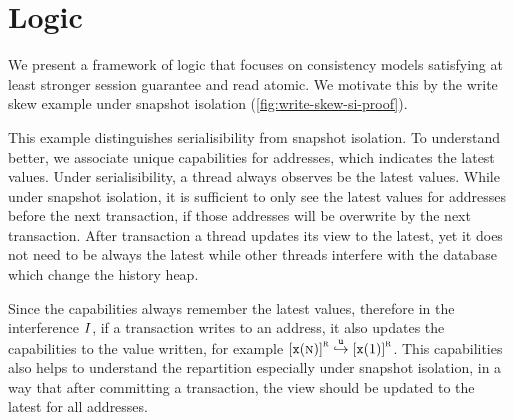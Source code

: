 \section{Logic}


We present a framework of logic that focuses on consistency models satisfying at least stronger session guarantee and read atomic.
We motivate this by the write skew example under snapshot isolation (\cref{fig:write-skew-si-proof}).

This example distinguishes serialisibility from snapshot isolation.
To understand better, we associate unique capabilities for addresses, which indicates the latest values.
Under serialisibility, a thread always observes be the latest values.
While under snapshot isolation, it is sufficient to only see the latest values for addresses before the next transaction, if those addresses will be overwrite by the next transaction.
After transaction a thread updates its view to the latest, yet it does not need to be always the latest while other threads interfere with the database which change the history heap.

Since the capabilities always remember the latest values, therefore in the interference \( I \), if a transaction writes to an address, it also updates the capabilities to the value written, for example \( \cass{\CB{x}(\V n)}{\lrid} \fpU \cass{\CB{x}(1)}{\lrid} \).
This capabilities also helps to understand the repartition especially under snapshot isolation, in a way that after committing a transaction, the view should be updated to the latest for all addresses.

